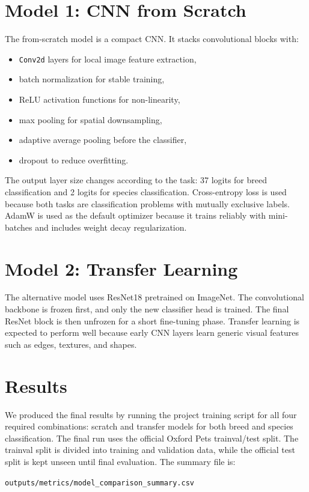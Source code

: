 \documentclass[11pt,a4paper]{article}
\begin{document}
\section{Model 1: CNN from Scratch}
The from-scratch model is a compact CNN. It stacks convolutional blocks with:
\begin{itemize}
    \item \texttt{Conv2d} layers for local image feature extraction,
    \item batch normalization for stable training,
    \item ReLU activation functions for non-linearity,
    \item max pooling for spatial downsampling,
    \item adaptive average pooling before the classifier,
    \item dropout to reduce overfitting.
\end{itemize}
The output layer size changes according to the task: 37 logits for breed classification and 2 logits for species classification. Cross-entropy loss is used because both tasks are classification problems with mutually exclusive labels. AdamW is used as the default optimizer because it trains reliably with mini-batches and includes weight decay regularization.

\section{Model 2: Transfer Learning}
The alternative model uses ResNet18 pretrained on ImageNet. The convolutional backbone is frozen first, and only the new classifier head is trained. The final ResNet block is then unfrozen for a short fine-tuning phase. Transfer learning is expected to perform well because early CNN layers learn generic visual features such as edges, textures, and shapes.

\clearpage
\section{Results}
We produced the final results by running the project training script for all four required combinations: scratch and transfer models for both breed and species classification. The final run uses the official Oxford Pets trainval/test split. The trainval split is divided into training and validation data, while the official test split is kept unseen until final evaluation. The summary file is:
\begin{center}
\texttt{outputs/metrics/model\_comparison\_summary.csv}
\end{center}
\end{document}
